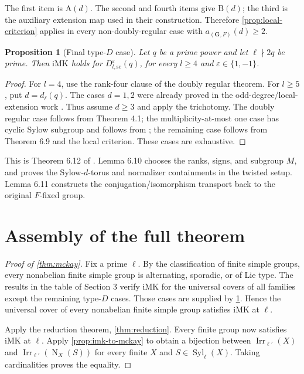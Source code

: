 \documentclass[11pt]{article}
\newtheorem{proposition}[theorem]{Proposition}
\newcommand{\Irr}{\operatorname{Irr}}
\newcommand{\Norm}{\operatorname{N}}
\newcommand{\Syl}{\operatorname{Syl}}
\newcommand{\IMK}{\mathrm{iMK}}
\newcommand{\Ad}{\mathrm{A}(d)}
\newcommand{\Bd}{\mathrm{B}(d)}
\newcommand{\G}{\mathbf{G}}
\begin{document}
The first item is \(\Ad\).  The second and fourth items give \(\Bd\);
the third is the auxiliary extension map used in their construction.
Therefore \cref{prop:local-criterion} applies in every
non-doubly-regular case with \(a_{(\G,F)}(d)\geq2\).

\begin{proposition}[Final type-\(D\) case]\label{prop:type-d}
Let \(q\) be a prime power and let \(\ell\nmid 2q\) be prime.  Then
\(\IMK\) holds for \(D_{l,\mathrm{sc}}^\varepsilon(q)\), for every
\(l\geq4\) and \(\varepsilon\in\{1,-1\}\).
\end{proposition}

\begin{proof}
For \(l=4\), use the rank-four clause of the doubly regular theorem.
For \(l\geq5\), put \(d=d_\ell(q)\).  The cases \(d=1,2\) were already
proved in the odd-degree/local-extension work
\cite{MalleSpath2016}.  Thus assume \(d\geq3\) and apply the trichotomy.
The doubly regular case follows from Theorem 4.1; the multiplicity-at-most
one case has cyclic Sylow subgroup and follows from
\cite{KoshitaniSpath2016}; the remaining case follows from Theorem 6.9
and the local criterion.  These cases are exhaustive.
\end{proof}

This is Theorem 6.12 of \cite{CabanesSpath2026}.  Lemma 6.10 chooses the
ranks, signs, and subgroup \(M\), and proves the Sylow-\(d\)-torus and
normalizer containments in the twisted setup.  Lemma 6.11 constructs the
conjugation/isomorphism transport back to the original \(F\)-fixed group.

\section{Assembly of the full theorem}

\begin{proof}[Proof of \cref{thm:mckay}]
Fix a prime \(\ell\).  By the classification of finite simple groups,
every nonabelian finite simple group is alternating, sporadic, or of Lie
type.  The results in the table of Section 3 verify \(\IMK\) for the
universal covers of all families except the remaining type-\(D\) cases.
Those cases are supplied by \cref{prop:type-d}.  Hence the universal
cover of every nonabelian finite simple group satisfies \(\IMK\) at
\(\ell\).

Apply the reduction theorem, \cref{thm:reduction}.  Every finite group
now satisfies \(\IMK\) at \(\ell\).  Apply
\cref{prop:imk-to-mckay} to obtain a bijection between
\(\Irr_{\ell'}(X)\) and
\(\Irr_{\ell'}(\Norm_X(S))\) for every finite \(X\) and
\(S\in\Syl_\ell(X)\).  Taking cardinalities proves the equality.
\end{proof}
\end{document}
